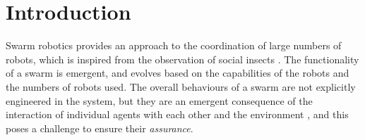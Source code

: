 \documentclass[runningheads]{llncs}
\begin{document}
\begin{abstract}
	
\end{abstract}
%
%
%

\section{Introduction}\label{introduction}
Swarm robotics provides an approach to the coordination of large numbers of robots, which is inspired from the observation of social insects \cite{Sahin2005}. 
The functionality of a swarm is emergent, and evolves based on the capabilities of the robots and the numbers of robots used. 
The overall behaviours of a swarm are not explicitly engineered in the system, but they are an emergent consequence of the interaction of individual agents with each other and the environment \cite{Abeywickrama2022}, and this poses a challenge to ensure their \emph{assurance}. 
\end{document}

